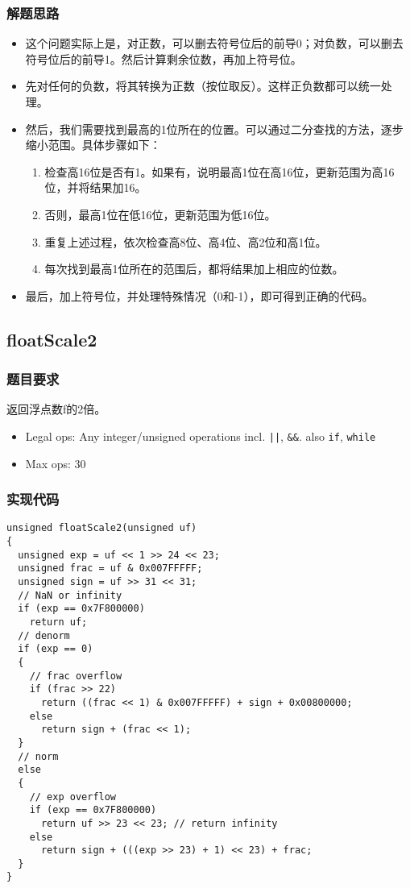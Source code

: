 \documentclass{article}
\begin{document}
\subsubsection{解题思路}
\begin{itemize}
    \item 这个问题实际上是，对正数，可以删去符号位后的前导0；对负数，可以删去符号位后的前导1。然后计算剩余位数，再加上符号位。
    \item 先对任何的负数，将其转换为正数（按位取反）。这样正负数都可以统一处理。
    \item 然后，我们需要找到最高的1位所在的位置。可以通过二分查找的方法，逐步缩小范围。具体步骤如下：
      \begin{enumerate}
        \item 检查高16位是否有1。如果有，说明最高1位在高16位，更新范围为高16位，并将结果加16。
        \item 否则，最高1位在低16位，更新范围为低16位。
        \item 重复上述过程，依次检查高8位、高4位、高2位和高1位。
        \item 每次找到最高1位所在的范围后，都将结果加上相应的位数。
      \end{enumerate}
    \item 最后，加上符号位，并处理特殊情况（0和-1），即可得到正确的代码。
\end{itemize}

\subsection{floatScale2}
\subsubsection{题目要求}
返回浮点数f的2倍。
\begin{itemize}
    \item Legal ops: Any integer/unsigned operations incl. \texttt{||}, \texttt{\&\&}. also \texttt{if}, \texttt{while}
    \item Max ops: 30
\end{itemize}

\subsubsection{实现代码}
\begin{lstlisting}[caption={floatScale2}]
unsigned floatScale2(unsigned uf)
{
  unsigned exp = uf << 1 >> 24 << 23;
  unsigned frac = uf & 0x007FFFFF;
  unsigned sign = uf >> 31 << 31;
  // NaN or infinity
  if (exp == 0x7F800000)
    return uf;
  // denorm
  if (exp == 0)
  {
    // frac overflow
    if (frac >> 22)
      return ((frac << 1) & 0x007FFFFF) + sign + 0x00800000;
    else
      return sign + (frac << 1);
  }
  // norm
  else
  {
    // exp overflow
    if (exp == 0x7F800000)
      return uf >> 23 << 23; // return infinity
    else
      return sign + (((exp >> 23) + 1) << 23) + frac;
  }
}
\end{lstlisting}
\end{document}
